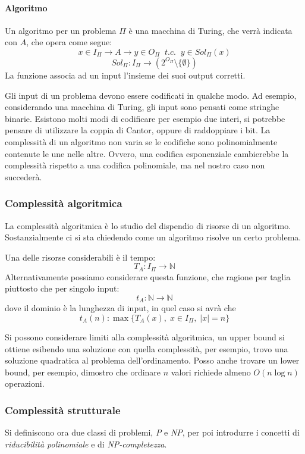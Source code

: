 \paragraph{Algoritmo}
Un algoritmo per un problema $\Pi$ è una macchina di Turing, che verrà indicata con $A$, che opera come segue:
$$x \in I_{\Pi} \longrightarrow A \longrightarrow y \in O_{\Pi}\;\;t.c.\;\;y \in Sol_{\Pi}(x)$$
$$Sol_{\Pi}: I_\Pi \longrightarrow (2^{O_\Pi} \setminus \{\emptyset\})$$
La funzione associa ad un input l'insieme dei suoi output corretti.

\begin{remark}
    Gli input di un problema devono essere codificati in qualche modo. 
    Ad esempio, considerando una macchina di Turing, gli input sono 
    pensati come stringhe binarie. 
    Esistono molti modi di codificare per esempio due interi, si potrebbe pensare di utilizzare la coppia di Cantor, oppure di raddoppiare i bit.
    La complessità di un algoritmo non varia se le codifiche sono 
    polinomialmente contenute le une nelle altre. Ovvero, una codifica esponenziale cambierebbe la complessità rispetto a una codifica polinomiale, 
    ma nel nostro caso non succederà.
\end{remark}

\subsubsection{Complessità algoritmica}
La complessità algoritmica è lo studio del dispendio di risorse di 
un algoritmo. Sostanzialmente ci si sta chiedendo come un algoritmo risolve un certo problema.

Una delle risorse considerabili è il tempo: $$T_A : I_\Pi \rightarrow \mathbb{N}$$
Alternativamente possiamo considerare questa funzione, che ragione per taglia piuttosto 
che per singolo input: 
$$t_A : \mathbb{N} \rightarrow \mathbb{N}$$ dove il dominio è 
la lunghezza di input, in quel caso si avrà che 
$$t_A(n) : \max\{ T_A(x),\; x \in I_{\Pi},\; |x| = n\}$$

Si possono considerare limiti alla complessità algoritmica, un upper bound si ottiene 
esibendo una soluzione con quella complessità, per esempio, trovo una soluzione quadratica 
al problema dell'ordinamento. Posso anche trovare un lower bound, per esempio, 
dimostro che ordinare $n$ valori richiede almeno $O(n \log n)$ operazioni.

\subsubsection{Complessità strutturale}
Si definiscono ora due classi di problemi, \emph{P} e \emph{NP}, per 
poi introdurre i concetti di \emph{riducibilità polinomiale} e di \emph{NP-completezza}.

